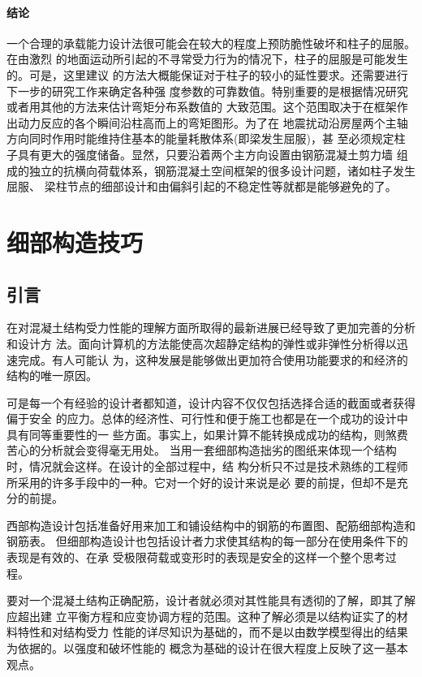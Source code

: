 \documentclass[12pt,a4paper]{book}
\begin{document}
\subsubsection{结论}

一个合理的承载能力设计法很可能会在较大的程度上预防脆性破坏和柱子的屈服。在由激烈
的地面运动所引起的不寻常受力行为的情况下，柱子的屈服是可能发生的。可是，这里建议
的方法大概能保证对于柱子的较小的延性要求。还需要进行下一步的研究工作来确定各种强
度参数的可靠数值。特别重要的是根据情况研究或者用其他的方法来估计弯矩分布系数值的
大致范围。这个范围取决于在框架作出动力反应的各个瞬间沿柱高而上的弯矩图形。为了在
地震扰动沿房屋两个主轴方向同时作用时能维持住基本的能量耗散体系(即梁发生屈服)，甚
至必须规定柱子具有更大的强度储备。显然，只要沿着两个主方向设置由钢筋混凝土剪力墙
组成的独立的抗横向荷载体系，钢筋混凝土空间框架的很多设计问题，诸如柱子发生屈服、
梁柱节点的细部设计和由偏斜引起的不稳定性等就都是能够避免的了。

\chapter{细部构造技巧}

\section{引言}

在对混凝土结构受力性能的理解方面所取得的最新进展已经导致了更加完善的分析和设计方
法。面向计算机的方法能使高次超静定结构的弹性或非弹性分析得以迅速完成。有人可能认
为，这种发展是能够做出更加符合使用功能要求的和经济的结构的唯一原因。

可是每一个有经验的设计者都知道，设计内容不仅仅包括选择合适的截面或者获得偏于安全
的应力。总体的经济性、可行性和便于施工也都是在一个成功的设计中具有同等重要性的一
些方面。事实上，如果计算不能转换成成功的结构，则煞费苦心的分析就会变得毫无用处。
当用一套细部构造拙劣的图纸来体现一个结构时，情况就会这样。在设计的全部过程中，结
构分析只不过是技术熟练的工程师所采用的许多手段中的一种。它对一个好的设计来说是必
要的前提，但却不是充分的前提。

西部构造设计包括准备好用来加工和铺设结构中的钢筋的布置图、配筋细部构造和钢筋表。
但细部构造设计也包括设计者力求使其结构的每一部分在使用条件下的表现是有效的、在承
受极限荷载或变形时的表现是安全的这样一个整个思考过程。

要对一个混凝土结构正确配筋，设计者就必须对其性能具有透彻的了解，即其了解应超出建
立平衡方程和应变协调方程的范围。这种了解必须是以结构证实了的材料特性和对结构受力
性能的详尽知识为基础的，而不是以由数学模型得出的结果为依据的。以强度和破坏性能的
概念为基础的设计在很大程度上反映了这一基本观点。
\end{document}
